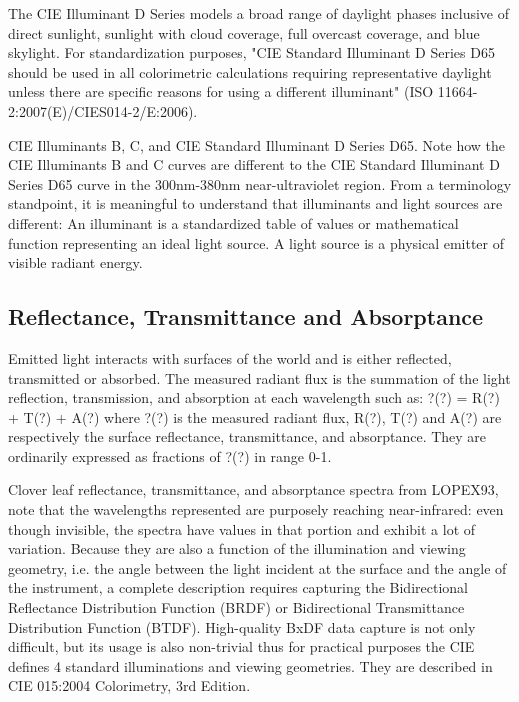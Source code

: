 The CIE Illuminant D Series models a broad range of daylight phases inclusive of direct sunlight, sunlight with cloud coverage, full overcast coverage, and blue skylight. For standardization purposes, "CIE Standard Illuminant D Series D65 should be used in all colorimetric calculations requiring representative daylight unless there are specific reasons for using a different illuminant" (ISO 11664-2:2007(E)/CIES014-2/E:2006).

CIE Illuminants B, C, and CIE Standard Illuminant D Series D65. Note how the CIE Illuminants B and C curves are different to the CIE Standard Illuminant D Series D65 curve in the 300nm-380nm near-ultraviolet region.
From a terminology standpoint, it is meaningful to understand that illuminants and light sources are different:
An illuminant is a standardized table of values or mathematical function representing an ideal light source.
A light source is a physical emitter of visible radiant energy.

\subsection{Reflectance, Transmittance and Absorptance}%
\label{subsec:reflectance-transmittance-and-absorptance}

Emitted light interacts with surfaces of the world and is either reflected, transmitted or absorbed. The measured radiant flux is the summation of the light reflection, transmission, and absorption at each wavelength such as:
?(?) = R(?) + T(?) + A(?)
where ?(?) is the measured radiant flux, R(?), T(?) and A(?) are respectively the surface reflectance, transmittance, and absorptance. They are ordinarily expressed as fractions of ?(?) in range 0-1.

Clover leaf reflectance, transmittance, and absorptance spectra from LOPEX93, note that the wavelengths represented are purposely reaching near-infrared: even though invisible, the spectra have values in that portion and exhibit a lot of variation.
Because they are also a function of the illumination and viewing geometry, i.e. the angle between the light incident at the surface and the angle of the instrument, a complete description requires capturing the Bidirectional Reflectance Distribution Function (BRDF) or Bidirectional Transmittance Distribution Function (BTDF). High-quality BxDF data capture is not only difficult, but its usage is also non-trivial thus for practical purposes the CIE defines 4 standard illuminations and viewing geometries. They are described in CIE 015:2004 Colorimetry, 3rd Edition.

